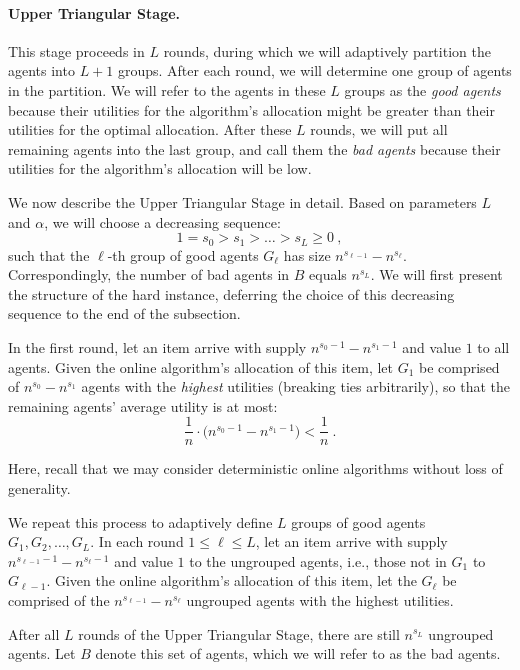 \documentclass[11pt,letterpaper]{article}
\begin{document}
\paragraph{Upper Triangular Stage.}
This stage proceeds in $L$ rounds, during which we will adaptively partition the agents into $L+1$ groups.
After each round, we will determine one group of agents in the partition.
We will refer to the agents in these $L$ groups as the \emph{good agents} because their utilities for the algorithm's allocation might be greater than their utilities for the optimal allocation.
After these $L$ rounds, we will put all remaining agents into the last group, and call them the \emph{bad agents} because their utilities for the algorithm's allocation will be low.

We now describe the Upper Triangular Stage in detail.
Based on parameters $L$ and $\alpha$, we will choose a decreasing sequence:
\[
	1 = s_0 > s_1 > \dots > s_L \geq 0
	~,
\] 
such that the $\ell$-th group of good agents $G_\ell$ has size $n^{s_{\ell-1}} - n^{s_\ell}$.
Correspondingly, the number of bad agents in $B$ equals $n^{s_L}$.
We will first present the structure of the hard instance, deferring the choice of this decreasing sequence to the end of the subsection.

In the first round, let an item arrive with supply $n^{s_0-1} - n^{s_1-1}$ and value $1$ to all agents.
Given the online algorithm's allocation of this item, let $G_1$ be comprised of $n^{s_0} - n^{s_1}$ agents with the \emph{highest} utilities (breaking ties arbitrarily), so that the remaining agents' average utility is at most:
\[
	\frac{1}{n} \cdot \big( n^{s_0-1} - n^{s_1-1} \big) < \frac{1}{n}
	~.
\]

Here, recall that we may consider deterministic online algorithms without loss of generality.


We repeat this process to adaptively define $L$ groups of good agents $G_1, G_2, \dots, G_L$.
In each round $1 \le \ell \le L$, let an item arrive with supply $n^{s_{\ell-1}-1} -n^{s_\ell-1}$ and value $1$ to the ungrouped agents, i.e., those not in $G_1$ to $G_{\ell-1}$.
Given the online algorithm's allocation of this item, let the $G_\ell$ be comprised of the $n^{s_{\ell-1}} - n^{s_\ell}$ ungrouped agents with the highest utilities.

After all $L$ rounds of the Upper Triangular Stage, there are still $n^{s_L}$ ungrouped agents.
Let $B$ denote this set of agents, which we will refer to as the bad agents.
\end{document}
